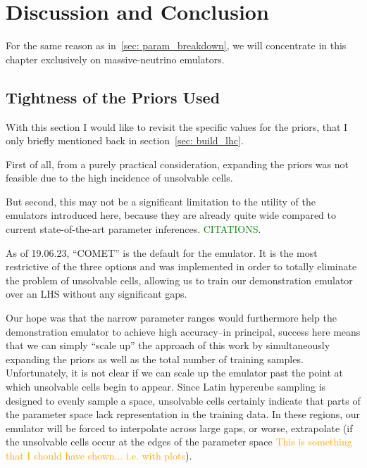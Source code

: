 \chapter{Discussion and Conclusion}
\label{chap: disc_and_conc}

For the same reason as in~\ref{sec: param_breakdown}, we will concentrate
in this chapter exclusively on massive-neutrino emulators.

\section{Tightness of the Priors Used}
\label{sec: prior_woes}

With this section I would like to revisit the specific values for the priors,
that I only briefly mentioned back in section~\ref{sec: build_lhc}.

First of all, from a purely practical consideration, expanding the priors was
not feasible due to the high incidence of unsolvable cells.

But second, this may not be a significant limitation to the utility of the
emulators introduced here, because they are already quite wide compared to
current state-of-the-art parameter inferences. \textcolor{green}{CITATIONS}.

As of 19.06.23, ``COMET'' is the default for the emulator. It is the most 
restrictive of the three options and was implemented in order to totally 
eliminate the problem of unsolvable cells, allowing us to train our 
demonstration emulator over an LHS without any significant gaps.

Our hope was that the narrow parameter ranges would furthermore help the 
demonstration emulator to achieve high accuracy--in principal, success here
means that we can simply ``scale up'' the approach of this work by
simultaneously expanding the priors as well as the total number of training
samples. Unfortunately, it is not clear if we can scale up the emulator past
the point at which unsolvable cells begin to appear. Since Latin hypercube
sampling is designed to evenly sample a space, unsolvable cells certainly
indicate that parts of the parameter space lack representation in the training
data. In these regions, our emulator will be forced to interpolate across
large gaps, or worse, extrapolate (if the unsolvable cells occur at the edges
of the parameter space \textcolor{orange}{This is something that I should have
shown... i.e. with plots}).

